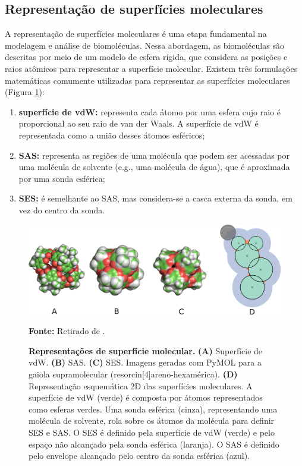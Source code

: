 \documentclass[Portugues]{phdquali}
\def\eg{e.g.\onedot}
\begin{document}

\subsection{Representação de superfícies moleculares}

A representação de superfícies moleculares é uma etapa fundamental na modelagem e análise de biomoléculas. Nessa abordagem, as biomoléculas são descritas por meio de um modelo de esfera rígida, que considera as posições e raios atômicos para representar a superfície molecular. Existem três formulações matemáticas comumente utilizadas para representar as superfícies moleculares (Figura \ref{fig:surface-representation}):

\begin{enumerate}[label=\textbf{(\Alph*)}]
  \item \textbf{superfície de vdW:} representa cada átomo por uma esfera cujo raio é proporcional ao seu raio de van der Waals. A superfície de vdW é representada como a união desses átomos esféricos; 
  \item \textbf{SAS:} representa as regiões de uma molécula que podem ser acessadas por uma molécula de solvente (\eg, uma molécula de água), que é aproximada por uma sonda esférica;
  \item \textbf{SES:} é semelhante ao SAS, mas considera-se a casca externa da sonda, em vez do centro da sonda.
\end{enumerate}

\begin{figure}[ht]
  \centerline{\includegraphics[scale=0.8]{images/surface-representation.png}}
  \centerline{\scriptsize{\textbf{Fonte:} Retirado de \cite{guerra2023B}.}}
  \caption[Representações de superfície molecular]{\textbf{Representações de superfície molecular.} \textbf{(A)} Superfície de vdW. \textbf{(B)} SAS. \textbf{(C)} SES. Imagens geradas com PyMOL para a gaiola supramolecular (resorcin[4]areno-hexamérica). \textbf{(D)} Representação esquemática 2D das superfícies moleculares. A superfície de vdW (verde) é composta por átomos representados como esferas verdes. Uma sonda esférica (cinza), representando uma molécula de solvente, rola sobre os átomos da molécula para definir SES e SAS. O SES é definido pela superfície de vdW (verde) e pelo espaço não alcançado pela sonda esférica (laranja). O SAS é definido pelo envelope alcançado pelo centro da sonda esférica (azul).}
  \label{fig:surface-representation}
\end{figure}
\end{document}
